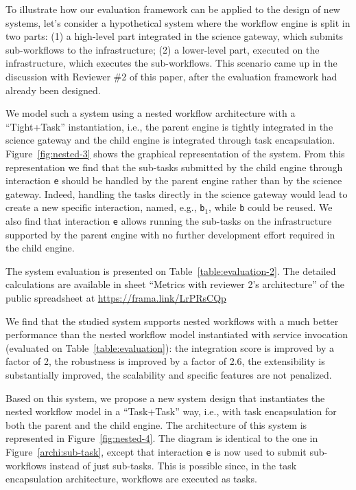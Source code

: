 \documentclass[preprint,3p,twocolumn]{elsarticle}
\newcommand{\todo}[2]{\pdfmargincomment[color=red,author=#1,open=true]{#2}}
\newcommand{\correction}[1]{\color{blue}#1\color{black}\xspace}
\begin{document}
\correction{To illustrate how our evaluation framework can be applied
  to the design of new systems, let's consider a hypothetical system
  where the workflow engine is split in two parts: (1) a high-level
  part integrated in the science gateway, which submits sub-workflows
  to the infrastructure; (2) a lower-level part, executed on the
  infrastructure, which executes the sub-workflows. This scenario came
  up in the discussion with Reviewer \#2 of this paper, after the
  evaluation framework had already been designed.

  We model such a system using a nested workflow architecture with a
  ``Tight+Task'' instantiation, i.e., the parent engine is tightly
  integrated in the science gateway and the child engine is
  integrated through task encapsulation.  Figure~\ref{fig:nested-3}
  shows the graphical representation of the system. From this
  representation we find that the sub-tasks submitted by the child
  engine through interaction \texttt{e} should be handled by the
  parent engine rather than by the science gateway. Indeed, handling
  the tasks directly in the science gateway would lead to create a new
  specific interaction, named, e.g., \texttt{b$_1$}, while \texttt{b}
  could be reused. We also find that interaction \texttt{e} allows
  running the sub-tasks on the infrastructure supported by the parent
  engine with no further development effort required in the child
  engine.

The system evaluation is presented on
Table~\ref{table:evaluation-2}. The detailed calculations are
available in sheet ``Metrics with reviewer 2's architecture'' of the public spreadsheet at \url{https://frama.link/LrPRsCQp} \todo{revise that sheet to merge it with the main one}.

We find that the studied system supports nested workflows with a much
better performance than the nested workflow model instantiated with
service invocation (evaluated on Table~\ref{table:evaluation}): the
integration score is improved by a factor of 2, the robustness is
improved by a factor of 2.6, the extensibility is substantially
improved, the scalability and specific features are not penalized.

Based on this system, we propose a new system design that instantiates
the nested workflow model in a ``Task+Task'' way, i.e., with task
encapsulation for both the parent and the child engine. The
architecture of this system is represented in
Figure~\ref{fig:nested-4}. The diagram is identical to the one in
Figure~\ref{archi:sub-task}, except that interaction \texttt{e} is now
used to submit sub-workflows instead of just sub-tasks. This is
possible since, in the task encapsulation architecture, workflows are
executed as tasks.

}
\end{document}

